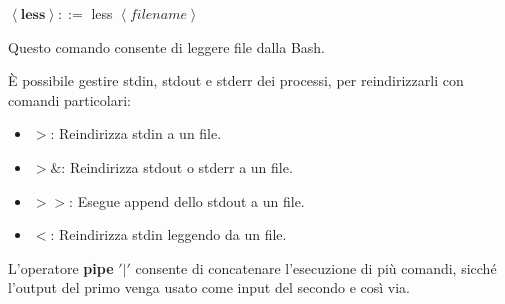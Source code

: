 \noindent \noindent$\left<\textbf{less}\right>::=$ less $\left<filename\right>$\par
Questo comando consente di leggere file dalla Bash.\newline

\noindent È possibile gestire stdin, stdout e stderr dei processi, per reindirizzarli con comandi particolari: \begin{itemize}
	\item $>$: Reindirizza stdin a un file.
	\item $>\&$: Reindirizza stdout o stderr a un file.
	\item $>>$: Esegue append dello stdout a un file.
	\item $<$: Reindirizza stdin leggendo da un file.
\end{itemize}

\noindent L'operatore \textbf{pipe} $'|'$ consente di concatenare l'esecuzione di più comandi, sicché l'output del primo venga usato come input del
secondo e così via.

